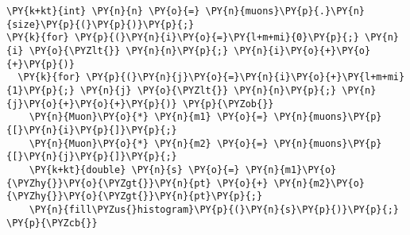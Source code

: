 \begin{Verbatim}[commandchars=\\\{\}]
\PY{k+kt}{int} \PY{n}{n} \PY{o}{=} \PY{n}{muons}\PY{p}{.}\PY{n}{size}\PY{p}{(}\PY{p}{)}\PY{p}{;}
\PY{k}{for} \PY{p}{(}\PY{n}{i}\PY{o}{=}\PY{l+m+mi}{0}\PY{p}{;} \PY{n}{i} \PY{o}{\PYZlt{}} \PY{n}{n}\PY{p}{;} \PY{n}{i}\PY{o}{+}\PY{o}{+}\PY{p}{)}
  \PY{k}{for} \PY{p}{(}\PY{n}{j}\PY{o}{=}\PY{n}{i}\PY{o}{+}\PY{l+m+mi}{1}\PY{p}{;} \PY{n}{j} \PY{o}{\PYZlt{}} \PY{n}{n}\PY{p}{;} \PY{n}{j}\PY{o}{+}\PY{o}{+}\PY{p}{)} \PY{p}{\PYZob{}}
    \PY{n}{Muon}\PY{o}{*} \PY{n}{m1} \PY{o}{=} \PY{n}{muons}\PY{p}{[}\PY{n}{i}\PY{p}{]}\PY{p}{;}
    \PY{n}{Muon}\PY{o}{*} \PY{n}{m2} \PY{o}{=} \PY{n}{muons}\PY{p}{[}\PY{n}{j}\PY{p}{]}\PY{p}{;}
    \PY{k+kt}{double} \PY{n}{s} \PY{o}{=} \PY{n}{m1}\PY{o}{\PYZhy{}}\PY{o}{\PYZgt{}}\PY{n}{pt} \PY{o}{+} \PY{n}{m2}\PY{o}{\PYZhy{}}\PY{o}{\PYZgt{}}\PY{n}{pt}\PY{p}{;}
    \PY{n}{fill\PYZus{}histogram}\PY{p}{(}\PY{n}{s}\PY{p}{)}\PY{p}{;} \PY{p}{\PYZcb{}}
\end{Verbatim}
